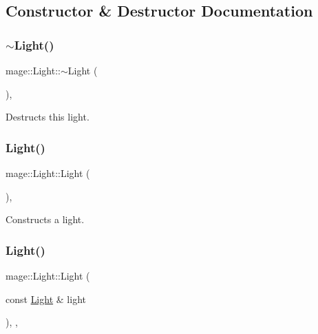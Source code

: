 \subsection{Constructor \& Destructor Documentation}
\hypertarget{classmage_1_1_light_af877bc473dede83689a4bda8a36d4d36}{}\label{classmage_1_1_light_af877bc473dede83689a4bda8a36d4d36} 
\subsubsection{\texorpdfstring{$\sim$\+Light()}{~Light()}}
{\footnotesize\ttfamily mage\+::\+Light\+::$\sim$\+Light (\begin{DoxyParamCaption}{ }\end{DoxyParamCaption})\hspace{0.3cm}{\ttfamily [virtual]}, {\ttfamily [default]}}

Destructs this light. \hypertarget{classmage_1_1_light_a69660fe611718db38c3951f49804ec3e}{}\label{classmage_1_1_light_a69660fe611718db38c3951f49804ec3e} 
\subsubsection{\texorpdfstring{Light()}{Light()}\hspace{0.1cm}{\footnotesize\ttfamily [1/3]}}
{\footnotesize\ttfamily mage\+::\+Light\+::\+Light (\begin{DoxyParamCaption}{ }\end{DoxyParamCaption})\hspace{0.3cm}{\ttfamily [protected]}, {\ttfamily [noexcept]}}

Constructs a light. \hypertarget{classmage_1_1_light_a022d4386ddd9666ea7292b1d51cb87d5}{}\label{classmage_1_1_light_a022d4386ddd9666ea7292b1d51cb87d5} 
\subsubsection{\texorpdfstring{Light()}{Light()}\hspace{0.1cm}{\footnotesize\ttfamily [2/3]}}
{\footnotesize\ttfamily mage\+::\+Light\+::\+Light (\begin{DoxyParamCaption}\item[{const \hyperlink{classmage_1_1_light}{Light} \&}]{light }\end{DoxyParamCaption})\hspace{0.3cm}{\ttfamily [protected]}, {\ttfamily [default]}, {\ttfamily [noexcept]}}

